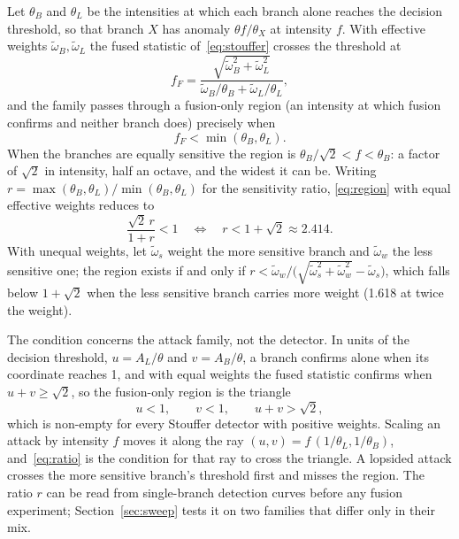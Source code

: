 Let $\theta_B$ and $\theta_L$ be the intensities at which each branch alone
reaches the decision threshold, so that branch $X$ has anomaly
$\theta f/\theta_X$ at intensity $f$. With effective weights
$\tilde\omega_B, \tilde\omega_L$ the fused statistic of~\eqref{eq:stouffer}
crosses the threshold at
\begin{equation}
\label{eq:ffused}
f_F = \frac{\sqrt{\tilde\omega_B^{2} + \tilde\omega_L^{2}}}
           {\tilde\omega_B/\theta_B + \tilde\omega_L/\theta_L},
\end{equation}
and the family passes through a fusion-only region (an intensity at which
fusion confirms and neither branch does) precisely when
\begin{equation}
\label{eq:region}
f_F < \min(\theta_B, \theta_L).
\end{equation}
When the branches are equally sensitive the region is
$\theta_B/\sqrt2 < f < \theta_B$: a factor of $\sqrt2$ in intensity, half an
octave, and the widest it can be. Writing
$r = \max(\theta_B,\theta_L)/\min(\theta_B,\theta_L)$ for the sensitivity
ratio, \eqref{eq:region} with equal effective weights reduces to
\begin{equation}
\label{eq:ratio}
\frac{\sqrt{2}\,r}{1+r} < 1
\quad\Longleftrightarrow\quad
r < 1 + \sqrt{2} \approx 2.414 .
\end{equation}
With unequal weights, let $\tilde\omega_s$ weight the more sensitive branch and
$\tilde\omega_w$ the less sensitive one; the region exists if and only if
$r < \tilde\omega_w / \bigl(\sqrt{\tilde\omega_s^2 + \tilde\omega_w^2} -
\tilde\omega_s\bigr)$, which falls below $1+\sqrt{2}$ when the less sensitive
branch carries more weight (1.618 at twice the weight).

The condition concerns the attack family, not the detector. In units of the
decision threshold, $u = A_L/\theta$ and $v = A_B/\theta$, a branch confirms
alone when its coordinate reaches 1, and with equal weights the fused
statistic confirms when $u + v \ge \sqrt2$, so the fusion-only region is the
triangle
\begin{equation}
\label{eq:wedge}
u < 1, \qquad v < 1, \qquad u + v > \sqrt2,
\end{equation}
which is non-empty for every Stouffer detector with positive weights. Scaling
an attack by intensity $f$ moves it along the ray
$(u, v) = f\,(1/\theta_L, 1/\theta_B)$, and~\eqref{eq:ratio} is the condition
for that ray to cross the triangle. A lopsided attack crosses the more
sensitive branch's threshold first and misses the region. The ratio $r$ can be
read from single-branch detection curves before any fusion experiment;
Section~\ref{sec:sweep} tests it on two families that differ only in their
mix.


